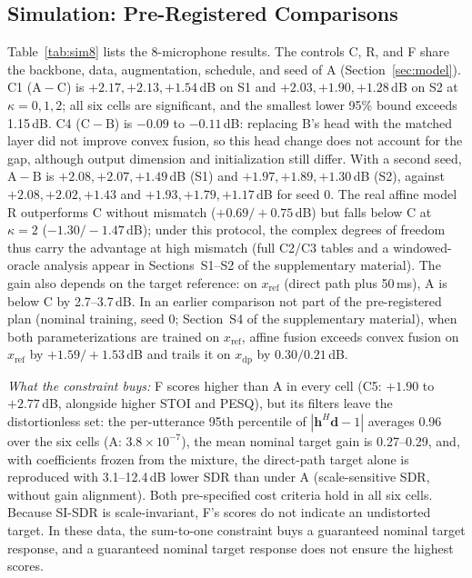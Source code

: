 \documentclass[journal]{IEEEtran}
\newcommand{\supp}{the supplementary material}
\begin{document}
\subsection{Simulation: Pre-Registered Comparisons}
\label{sec:sim}
Table~\ref{tab:sim8} lists the 8-microphone results. The controls C, R, and F share the backbone, data, augmentation, schedule, and seed of A (Section~\ref{sec:model}). C1 ($\mathrm A-\mathrm C$) is $+2.17,+2.13,+1.54$\,dB on S1 and $+2.03,+1.90,+1.28$\,dB on S2 at $\kappa=0,1,2$; all six cells are significant, and the smallest lower 95\% bound exceeds 1.15\,dB. C4 ($\mathrm C-\mathrm B$) is $-0.09$ to $-0.11$\,dB: replacing B's head with the matched layer did not improve convex fusion, so this head change does not account for the gap, although output dimension and initialization still differ. With a second seed, $\mathrm A-\mathrm B$ is $+2.08,+2.07,+1.49$\,dB (S1) and $+1.97,+1.89,+1.30$\,dB (S2), against $+2.08,+2.02,+1.43$ and $+1.93,+1.79,+1.17$\,dB for seed 0. The real affine model R outperforms C without mismatch ($+0.69/{+}0.75$\,dB) but falls below C at $\kappa=2$ ($-1.30/{-}1.47$\,dB); under this protocol, the complex degrees of freedom thus carry the advantage at high mismatch (full C2/C3 tables and a windowed-oracle analysis appear in Sections~S1--S2 of \supp). The gain also depends on the target reference: on $x_{\mathrm{ref}}$ (direct path plus 50\,ms), A is below C by 2.7--3.7\,dB. In an earlier comparison not part of the pre-registered plan (nominal training, seed 0; Section~S4 of \supp), when both parameterizations are trained on $x_{\mathrm{ref}}$, affine fusion exceeds convex fusion on $x_{\mathrm{ref}}$ by $+1.59/{+}1.53$\,dB and trails it on $x_{\mathrm{dp}}$ by $0.30/0.21$\,dB.

\emph{What the constraint buys:} F scores higher than A in every cell (C5: $+1.90$ to $+2.77$\,dB, alongside higher STOI and PESQ), but its filters leave the distortionless set: the per-utterance 95th percentile of $|\mathbf h^H\mathbf d-1|$ averages 0.96 over the six cells (A: $3.8\times10^{-7}$), the mean nominal target gain is 0.27--0.29, and, with coefficients frozen from the mixture, the direct-path target alone is reproduced with 3.1--12.4\,dB lower SDR than under A (scale-sensitive SDR, without gain alignment). Both pre-specified cost criteria hold in all six cells. Because SI-SDR is scale-invariant, F's scores do not indicate an undistorted target. In these data, the sum-to-one constraint buys a guaranteed nominal target response, and a guaranteed nominal target response does not ensure the highest scores.
\end{document}
